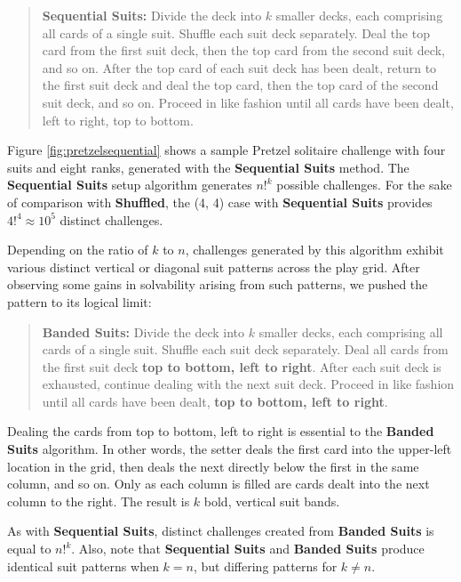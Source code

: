 \documentclass[journal]{IEEEtran}
\begin{document}
%
%
%

%

%
%
%
%

\begin{quote}
    {\bf Sequential Suits:} Divide the deck into $k$ smaller decks, each comprising all cards of a single suit. Shuffle each suit deck separately. Deal the top card from the first suit deck, then the top card from the second suit deck, and so on.  After the top card of each suit deck has been dealt, return to the first suit deck and deal the top card, then the top card of the second suit deck, and so on. Proceed in like fashion until all cards have been dealt, left to right, top to bottom.
\end{quote}

Figure \ref{fig:pretzelsequential} shows a sample Pretzel solitaire challenge with four suits and eight ranks, generated with the \textbf{Sequential Suits} method. The \textbf{Sequential Suits} setup algorithm generates $n!^{k}$ possible challenges. For the sake of comparison with \textbf{Shuffled}, the (4, 4) case with \textbf{Sequential Suits} provides $4!^{4} \approx 10^{5}$ distinct challenges.

Depending on the ratio of $k$ to $n$, challenges generated by this algorithm exhibit various distinct vertical or diagonal suit patterns across the play grid. After observing some gains in solvability arising from such patterns, we pushed the pattern to its logical limit:

\begin{quote}
    {\bf Banded Suits:} Divide the deck into $k$ smaller decks, each comprising all cards of a single suit. Shuffle each suit deck separately. Deal all cards from the first suit deck \textbf{top to bottom, left to right}. After each suit deck is exhausted, continue dealing with the next suit deck. Proceed in like fashion until all cards have been dealt, \textbf{top to bottom, left to right}.
\end{quote}

Dealing the cards from top to bottom, left to right is essential to the \textbf{Banded Suits} algorithm. In other words, the setter deals the first card into the upper-left location in the grid, then deals the next directly below the first in the same column, and so on. Only as each column is filled are cards dealt into the next column to the right. The result is $k$ bold, vertical suit bands.

As with \textbf{Sequential Suits}, distinct challenges created from \textbf{Banded Suits} is equal to $n!^{k}$. Also, note that \textbf{Sequential Suits} and \textbf{Banded Suits} produce identical suit patterns when $k = n$, but differing patterns for $k \neq n$.
\end{document}
